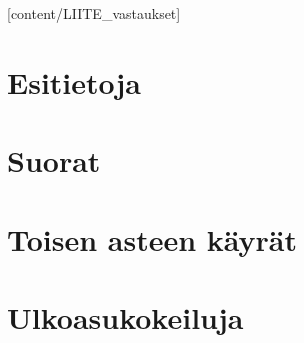 [content/LIITE_vastaukset]

\chapter{Esitietoja}
	
	\newpage 
	\newpage 
	\newpage 

\chapter{Suorat}
	
	\newpage 
	\newpage 
	\newpage 

\chapter{Toisen asteen käyrät}
	
	\newpage 
	\newpage 
	\newpage 
	\newpage 
	\newpage 
	\newpage 
	\newpage 

\chapter{Ulkoasukokeiluja}
	\newpage 

